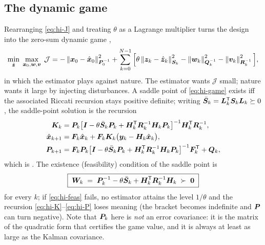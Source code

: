 \subsection{The dynamic game}
Rearranging \eqref{eq:hi-J} and treating $\theta$ as a Lagrange multiplier turns the design into
the zero-sum dynamic game \cite[\S11.3]{simon2006}, \cite{shen1997hinf}
\begin{equation}
\min_{\hat{\bm{z}}}\;\max_{\bm{x}_0,\bm{w},\bm{v}}\;
 \mathcal{J} = -\left\lVert \bm{x}_0-\hat{\bm{x}}_0 \right\rVert^2_{\bm{P}_0^{-1}}
 + \sum_{k=0}^{N-1}\Big[\theta\left\lVert \bm{z}_k-\hat{\bm{z}}_k \right\rVert^2_{\bm{S}_k}
  - \left\lVert \bm{w}_k \right\rVert^2_{\bm{Q}_k^{-1}} - \left\lVert \bm{v}_k \right\rVert^2_{\bm{R}_k^{-1}}\Big],
\label{eq:hi-game}
\end{equation}
in which the estimator plays against nature.  The estimator wants $\mathcal{J}$ small; nature
wants it large by injecting disturbances.  A saddle point of \eqref{eq:hi-game} exists iff the
associated Riccati recursion stays positive definite; writing
$\bar{\bm{S}}_k=\bm{L}_k^{\mathsf{T}}\bm{S}_k\bm{L}_k\succeq0$, the saddle-point solution is the recursion
\begin{align}
\bm{K}_k &= \bm{P}_k\big[\bm{I}-\theta\bar{\bm{S}}_k\bm{P}_k+\bm{H}_k^{\mathsf{T}}\bm{R}_k^{-1}\bm{H}_k\bm{P}_k\big]^{-1}
          \bm{H}_k^{\mathsf{T}}\bm{R}_k^{-1}, \label{eq:hi-K}\\
\hat{\bm{x}}_{k+1} &= \bm{F}_k\hat{\bm{x}}_k+\bm{F}_k\bm{K}_k\big(\bm{y}_k-\bm{H}_k\hat{\bm{x}}_k\big), \label{eq:hi-x}\\
\bm{P}_{k+1} &= \bm{F}_k\bm{P}_k\big[\bm{I}-\theta\bar{\bm{S}}_k\bm{P}_k+\bm{H}_k^{\mathsf{T}}\bm{R}_k^{-1}\bm{H}_k\bm{P}_k\big]^{-1}
             \bm{F}_k^{\mathsf{T}}+\bm{Q}_k, \label{eq:hi-P}
\end{align}
which is \cite[Eqs.~(11.72)--(11.76)]{simon2006}.  The existence (feasibility) condition of the
saddle point is
\begin{equation}
\boxed{\;\bm{W}_k \;=\; \bm{P}_k^{-1}-\theta\bar{\bm{S}}_k+\bm{H}_k^{\mathsf{T}}\bm{R}_k^{-1}\bm{H}_k \;\succ\;\bm 0\;}
\label{eq:hi-feas}
\end{equation}
for every $k$; if \eqref{eq:hi-feas} fails, no estimator attains the level $1/\theta$ and the
recursion \eqref{eq:hi-K}--\eqref{eq:hi-P} loses meaning (the bracket becomes indefinite and
$\bm{P}$ can turn negative).  Note that $\bm{P}_k$ here is \emph{not} an error covariance: it is the
matrix of the quadratic form that certifies the game value, and it is always at least as large as
the Kalman covariance.

